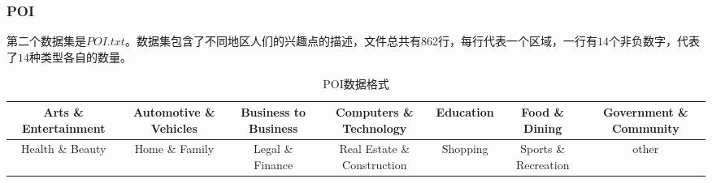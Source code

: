 \documentclass[a4paper, UTF8]{article}
\begin{document}
\begin{CJK}{UTF8}{gbsn}
\subsubsection*{POI}
第二个数据集是$POI.txt$。数据集包含了不同地区人们的兴趣点的描述，文件总共有862行，每行代表一个区域，一行有$14$个非负数字，代表了$14$种类型各自的数量。
\begin{table}[ht]
\centering 
\caption{POI数据格式}
\begin{tabular}{c|c|c|c|c|c|c}
\toprule 
\tiny{Arts} \& \tiny{Entertainment} &\tiny{Automotive} \& \tiny{Vehicles}&\tiny{Business} \tiny{to} \tiny{Business}&\tiny{Computers} \& \tiny{Technology}&\tiny{Education}&\tiny{Food} \& \tiny{Dining}&\tiny{Government} \& \tiny{Community}\\ \midrule \tiny{Health} 
\& \tiny{Beauty}&\tiny{Home} \& \tiny{Family}&\tiny{Legal} \& \tiny{Finance}&\tiny{Real} \tiny{Estate} \& \tiny{Construction}&\tiny{Shopping}&\tiny{Sports} \& \tiny{Recreation}&\tiny{other}\\
\bottomrule
\end{tabular}
\label{table1}
\end{table}

\end{CJK}
\end{document}
